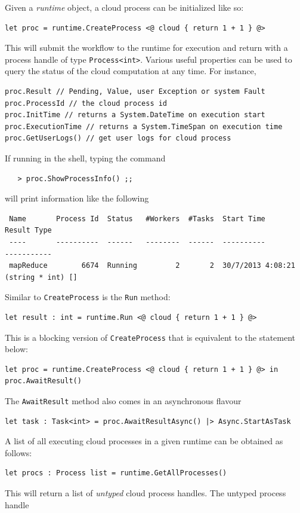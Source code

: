 Given a \emph{runtime} object, a cloud process can be initialized like so:
\begin{lstlisting}
let proc = runtime.CreateProcess <@ cloud { return 1 + 1 } @>
\end{lstlisting}
This will submit the workflow to the runtime for execution and return with a process handle of
type \texttt{Process<int>}. Various useful properties can be used to query the status of the
cloud computation at any time. For instance,
\begin{lstlisting}
proc.Result // Pending, Value, user Exception or system Fault
proc.ProcessId // the cloud process id
proc.InitTime // returns a System.DateTime on execution start
proc.ExecutionTime // returns a System.TimeSpan on execution time
proc.GetUserLogs() // get user logs for cloud process
\end{lstlisting}
If running in the \mbrace{} shell, typing the command
\begin{verbatim}
   > proc.ShowProcessInfo() ;;
\end{verbatim}
will print information like the following
\begin{verbatim}
 Name       Process Id  Status   #Workers  #Tasks  Start Time         Result Type       
 ----       ----------  ------   --------  ------  ----------         -----------       
 mapReduce        6674  Running         2       2  30/7/2013 4:08:21  (string * int) [] 
\end{verbatim}
Similar to \texttt{CreateProcess} is the \texttt{Run} method:
\begin{lstlisting}
let result : int = runtime.Run <@ cloud { return 1 + 1 } @>
\end{lstlisting}
This is a blocking version of \texttt{CreateProcess} that is equivalent to the statement below:
\begin{lstlisting}
let proc = runtime.CreateProcess <@ cloud { return 1 + 1 } @> in
proc.AwaitResult()
\end{lstlisting}
%
The \texttt{AwaitResult} method also comes in an asynchronous flavour
\begin{lstlisting}
let task : Task<int> = proc.AwaitResultAsync() |> Async.StartAsTask
\end{lstlisting}
%
A list of all executing cloud processes in a given runtime can be obtained as follows:
\begin{lstlisting}
let procs : Process list = runtime.GetAllProcesses()
\end{lstlisting}
This will return a list of \emph{untyped} cloud process handles. The untyped process handle
